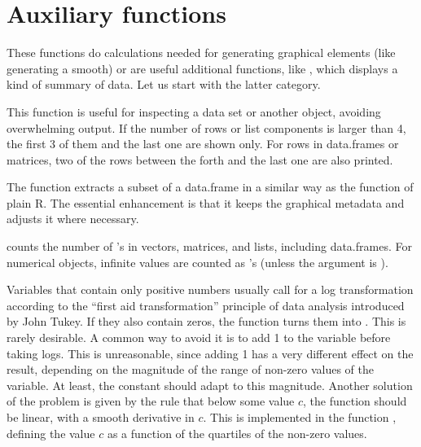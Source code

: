 \documentclass[11pt]{article}
\begin{document}
\section{Auxiliary functions}
These functions do calculations needed for generating graphical elements
(like generating a smooth) or are useful additional functions,
like , which displays a kind of summary of data.
Let us start with the latter category.

This function is useful for inspecting a data set or another object, 
avoiding overwhelming output. 
If the number of rows or list components is larger than 4,
the first 3 of them and the last one are shown only.
For rows in data.frames or matrices, two of the rows between the forth and
the last one are also printed.

The function  extracts a subset of a data.frame in a similar way
as the  function of plain R.
The essential enhancement is that it keeps the graphical metadata and 
adjusts it where necessary.


 counts the number of 's in vectors, matrices, and lists, 
including data.frames. 
For numerical objects, infinite values are counted as 's 
(unless the argument  is ).

Variables that contain only positive numbers usually call for a 
log transformation according to the ``first aid transformation'' principle
of data analysis introduced by John Tukey.
If they also contain zeros, the  function turns them into .
This is rarely desirable. 
A common way to avoid it is to add 1 to the variable before taking logs.
This is unreasonable, since adding 1 has a very different effect on the
result, depending on the magnitude of the range of non-zero values of the
variable. At least, the constant should adapt to this magnitude.
Another solution of the problem is given by the rule that below some
value $c$, the function should be linear, with a smooth derivative in $c$.
This is implemented in the function , defining the value $c$
as a function of the quartiles of the non-zero values.
\end{document}
